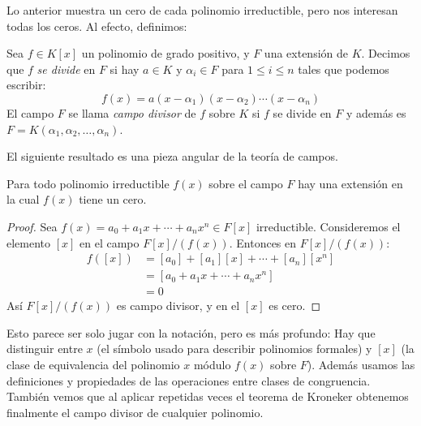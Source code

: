   Lo anterior muestra un cero de cada polinomio irreductible,
  pero nos interesan todas los ceros.
  Al efecto,
  definimos:
  \begin{definition}
    Sea \(f \in K[x]\) un polinomio de grado positivo,
    y \(F\) una extensión de \(K\).
    Decimos que \(f\) \emph{se divide} en \(F\)
    si hay \(a \in K\) y \(\alpha_i \in F\) para \(1 \le i \le n\)
    tales que podemos escribir:
    \begin{equation*}
      f(x)
	= a (x - \alpha_1) (x - \alpha_2) \dotsm (x - \alpha_n)
    \end{equation*}
    El campo \(F\) se llama \emph{campo divisor}
    de \(f\) sobre \(K\)
    si \(f\) se divide en \(F\)
    y además es \(F = K(\alpha_1, \alpha_2, \dotsc, \alpha_n)\).
  \end{definition}

  El siguiente resultado es una pieza angular
  de la teoría de campos.
  \begin{theorem}[Kroneker]
    \label{theo:Kroneker}
    Para todo polinomio irreductible \(f(x)\) sobre el campo \(F\)
    hay una extensión en la cual \(f(x)\) tiene un cero.
  \end{theorem}
  \begin{proof}
    Sea \(f(x) = a_0 + a_1 x + \dotsb + a_n x^n \in F[x]\)
      irreductible.
    Consideremos el elemento \([x]\) en el campo \(F[x] / (f(x))\).
    Entonces en \(F[x] / (f(x))\):
    \begin{align*}
      f([x])
	&= [a_0] + [a_1] [x] + \dotsb + [a_n] [x^n] \\
	&= [a_0 + a_1 x + \dotsb + a_n x^n] \\
	&= 0
    \end{align*}
    Así \(F[x] / (f(x))\) es campo divisor,
    y en el \([x]\) es cero.
  \end{proof}
  \noindent
  Esto parece ser solo jugar con la notación,
  pero es más profundo:
  Hay que distinguir entre \(x\)
  (el símbolo usado para describir polinomios formales)
  y \([x]\)
  (la clase de equivalencia del polinomio \(x\) módulo \(f(x)\)
   sobre \(F\)).
  Además usamos las definiciones y propiedades
  de las operaciones entre clases de congruencia.
  También vemos
  que al aplicar repetidas veces el teorema de Kroneker
  obtenemos finalmente el campo divisor de cualquier polinomio.

